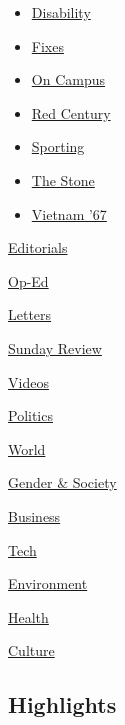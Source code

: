 \begin{itemize}
\tightlist
\item
  \href{/column/disability}{Disability}
\item
  \href{/column/fixes}{Fixes}
\item
  \href{/column/on-campus}{On Campus}
\item
  \href{/column/red-century}{Red Century}
\item
  \href{/column/sporting}{Sporting}
\item
  \href{/column/the-stone}{The Stone}
\item
  \href{/column/vietnam-67}{Vietnam '67}
\end{itemize}

\href{/section/opinion/editorials}{Editorials}

\href{/section/opinion/contributors}{Op-Ed}

\href{/section/opinion/letters}{Letters}

\href{/section/opinion/sunday}{Sunday Review}

\href{/video/opinion}{Videos}

\href{/section/opinion/politics}{Politics}

\href{/section/opinion/international-world}{World}

\href{/section/opinion/gender-and-society}{Gender \& Society}

\href{/section/opinion/business-economics}{Business}

\href{/section/opinion/technology}{Tech}

\href{/section/opinion/environment}{Environment}

\href{/section/opinion/health}{Health}

\href{/section/opinion/culture}{Culture}

\hypertarget{highlights}{%
\subsection{Highlights}\label{highlights}}

